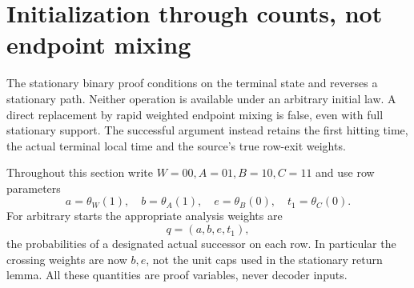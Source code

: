 \documentclass[11pt,letterpaper]{article}
\theoremstyle{definition}\newtheorem{definition}[theorem]{Definition}
\theoremstyle{remark}\newtheorem{remark}[theorem]{Remark}
\begin{document}
\section{Initialization through counts, not endpoint mixing}\label{sec:initialization}
The stationary binary proof conditions on the terminal state and reverses a stationary path. Neither operation is available under an arbitrary initial law. A direct replacement by rapid weighted endpoint mixing is false, even with full stationary support. The successful argument instead retains the first hitting time, the actual terminal local time and the source's true row-exit weights.

Throughout this section write $W=00,A=01,B=10,C=11$ and use row parameters
\[
 a=\theta_W(1),\quad b=\theta_A(1),\quad
 e=\theta_B(0),\quad t_1=\theta_C(0).
\]
For arbitrary starts the appropriate analysis weights are
\[
 q=(a,b,e,t_1),
\]
the probabilities of a designated actual successor on each row. In particular the crossing weights are now $b,e$, not the unit caps used in the stationary return lemma. All these quantities are proof variables, never decoder inputs.
\end{document}

